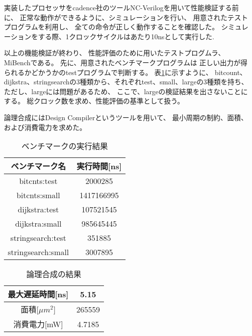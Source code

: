 \documentclass[../main.tex]{subfiles}
\begin{document}
    実装したプロセッサをcadence社のツールNC-Verilogを用いて性能検証する前に、
    正常な動作ができるように、シミュレーションを行い、
    用意されたテストプログラムを利用し、
    全ての命令が正しく動作することを確認した。
    シミュレーションをする際、1クロックサイクルはあたり10nsとして実行した.

    以上の機能検証が終わり、
    性能評価のために用いたテストプログムラ、MiBenchである。
    先に、用意されたベンチマークプログラムは
    正しい出力が得られるかどかうかのtestプログラムで判断する。
    表\ref{table:benchmark}に示すように、
    bitcount、dijkstra、stringsearchの3種類から、それぞれtest、small、largeの3種類を持ち、
    ただし、largeには問題があるため、
    ここで、largeの検証結果を出さないことにする。
    総クロック数を求め、性能評価の基準として扱う。

    論理合成にはDesign Compilerというツールを用いて、
    最小周期の制約、面積、および消費電力を求めた。

    \begin{table}[h]
        \centering
        \caption{ベンチマークの実行結果}
        \label{table:benchmark}
        \begin{tabular}{ |c|c| }
         \hline
         ベンチマーク名 & 実行時間[ns]\\
         \hline
         bitcnts:test & 2000285 \\
        \hline
         bitcnts:small & 1417166995 \\
        \hline
         dijkstra:test & 107521545 \\
        \hline
         dijkstra:small & 985645445 \\
        \hline
         stringsearch:test & 351885 \\
        \hline
         stringsearch:small & 3007895 \\
        \hline
        \end{tabular}
    \end{table}

    \begin{table}[h]
        \centering
        \caption{論理合成の結果}
        \label{table:synthesis}
        \begin{tabular}{ |c|c| }
        \hline
        最大遅延時間[ns] & 5.15 \\
        \hline
        面積[$\mu$$m^2$] & 265559 \\
        \hline
        消費電力[mW] & 4.7185 \\
        \hline
        \end{tabular}
    \end{table}
\end{document}
